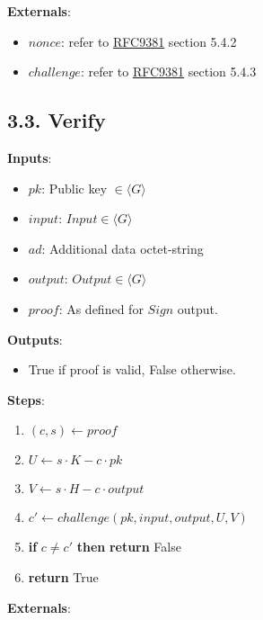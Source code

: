 \documentclass[
]{article}
\providecommand{\tightlist}{%
  \setlength{\itemsep}{0pt}\setlength{\parskip}{0pt}}
\begin{document}
\textbf{Externals}:

\begin{itemize}
\tightlist
\item
  \(nonce\): refer to
  \href{https://datatracker.ietf.org/doc/rfc9381}{RFC9381} section 5.4.2
\item
  \(challenge\): refer to
  \href{https://datatracker.ietf.org/doc/rfc9381}{RFC9381} section 5.4.3
\end{itemize}

\hypertarget{verify}{%
\subsection{3.3. Verify}\label{verify}}

\textbf{Inputs}:

\begin{itemize}
\tightlist
\item
  \(pk\): Public key \(\in \langle G \rangle\)
\item
  \(input\): \(Input \in \langle G \rangle\)
\item
  \(ad\): Additional data octet-string
\item
  \(output\): \(Output \in \langle G \rangle\)
\item
  \(proof\): As defined for \(Sign\) output.
\end{itemize}

\textbf{Outputs}:

\begin{itemize}
\tightlist
\item
  True if proof is valid, False otherwise.
\end{itemize}

\textbf{Steps}:

\begin{enumerate}
\def\labelenumi{\arabic{enumi}.}
\tightlist
\item
  \((c, s) \leftarrow proof\)
\item
  \(U \leftarrow s \cdot K - c \cdot pk\)
\item
  \(V \leftarrow s \cdot H - c \cdot output\)
\item
  \(c' \leftarrow challenge(pk, input, output, U, V)\)
\item
  \textbf{if} \(c \neq c'\) \textbf{then} \textbf{return} False
\item
  \textbf{return} True
\end{enumerate}

\textbf{Externals}:
\end{document}
